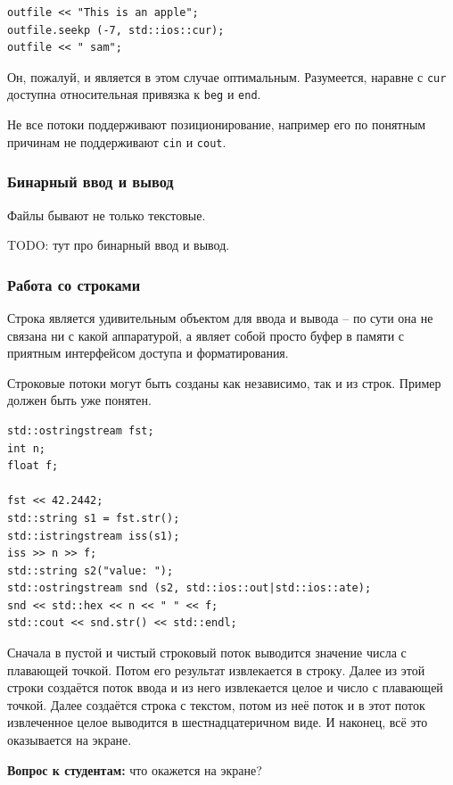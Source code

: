 \documentclass[a4paper,12pt,oneside]{article}
\begin{document}
\begin{lstlisting}
outfile << "This is an apple";
outfile.seekp (-7, std::ios::cur);
outfile << " sam";
\end{lstlisting}

Он, пожалуй, и является в этом случае оптимальным. Разумеется, наравне с \lstinline!cur! доступна относительная привязка к \lstinline!beg! и \lstinline!end!.

Не все потоки поддерживают позиционирование, например его по понятным причинам не поддерживают \lstinline!cin! и \lstinline!cout!.

\subsubsection{Бинарный ввод и вывод}

Файлы бывают не только текстовые. 

TODO: тут про бинарный ввод и вывод.

\subsubsection{Работа со строками}\label{subsub:strstream}

Строка является удивительным объектом для ввода и вывода -- по сути она не связана ни с какой аппаратурой, а являет собой просто буфер в памяти с приятным интерфейсом доступа и форматирования.

Строковые потоки могут быть созданы как независимо, так и из строк. Пример должен быть уже понятен.

\begin{lstlisting}
std::ostringstream fst;
int n;
float f;

fst << 42.2442;
std::string s1 = fst.str();
std::istringstream iss(s1);
iss >> n >> f;
std::string s2("value: ");
std::ostringstream snd (s2, std::ios::out|std::ios::ate);
snd << std::hex << n << " " << f;
std::cout << snd.str() << std::endl;
\end{lstlisting}

Сначала в пустой и чистый строковый поток выводится значение числа с плавающей точкой. Потом его результат извлекается в строку. Далее из этой строки создаётся поток ввода и из него извлекается целое и число с плавающей точкой. Далее создаётся строка с текстом, потом из неё поток и в этот поток извлеченное целое выводится в шестнадцатеричном виде. И наконец, всё это оказывается на экране.

\textbf{Вопрос к студентам:} что окажется на экране?
\end{document}
